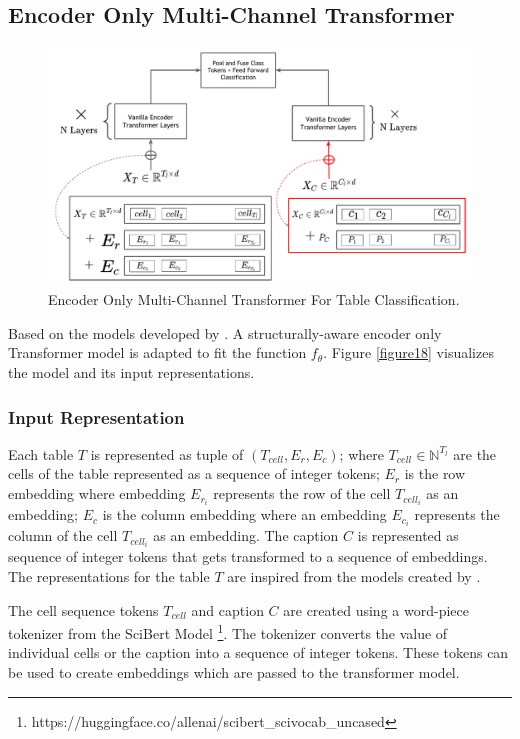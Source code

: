 \subsection{Encoder Only Multi-Channel Transformer}
\label{table_classification:models:encoder-model}
\begin{figure}[h]
    \centering
    \includegraphics[width=\maxwidth{\textwidth}]{src/images/Pic-Export-Enc-Trans-Thesis.pdf}
    \caption{Encoder Only Multi-Channel Transformer For Table Classification. }
    \label{figure\arabic{figurecounter}}
\end{figure}
Based on the models developed by \cite{deng2020turl}. A structurally-aware encoder only Transformer model is adapted to fit the function $f_\theta$. Figure \ref{figure18} visualizes the model and its input representations.

\subsubsection{Input Representation}
\label{table_classification:models:encoder-model:input-rep}
Each table $T$ is represented as tuple of $(T_{cell},E_r,E_c)$; where $T_{cell} \in \mathbb{N}^{T_l}$ are the cells of the table represented as a sequence of integer tokens; $E_r$ is the row embedding where embedding $E_{r_{i}}$ represents the row of the cell $T_{cell_{i}}$ as an embedding;  $E_c$ is the column embedding where an embedding $E_{c_{i}}$ represents the column of the cell $T_{cell_{i}}$ as an embedding. The caption $C$ is represented as sequence of integer tokens that gets transformed to a sequence of embeddings. The representations for the table $T$ are inspired from the models created by \cite{deng2020turl}. 

The cell sequence tokens $T_{cell}$ and caption $C$ are created using a word-piece tokenizer from the SciBert Model \footnote{https://huggingface.co/allenai/scibert\_scivocab\_uncased}. The tokenizer converts the value of individual cells or the caption into a sequence of integer tokens. These tokens can be used to create embeddings which are passed to the transformer model. 

